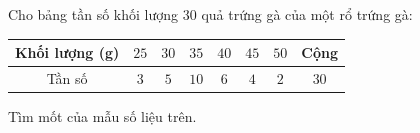 \begin{ex}
Cho bảng tần số khối lượng $30$ quả trứng gà của một rổ trứng gà:
\begin{center}
\begin{tabular}{|c|c|c|c|c|c|c|c|}\hline
Khối lượng (g) & $25$ & $30$ & $35$ & $40$ & $45$ & $50$ & Cộng\\\hline
Tần số & $3$ & $5$ & $10$ & $6$ & $4$ & $2$ & $30$\\\hline
\end{tabular}
\end{center}
Tìm mốt của mẫu số liệu trên.
\end{ex}
